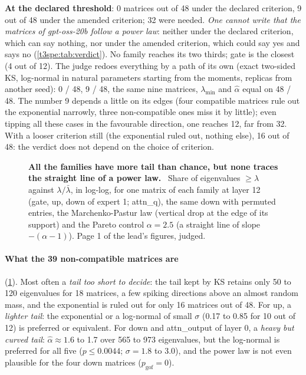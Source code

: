 \textbf{At the declared threshold}: 0 matrices out of 48 under the declared criterion, 9 out of 48 under the amended criterion; 32 were needed. \emph{One cannot write that the matrices of gpt-oss-20b follow a power law}: neither under the declared criterion, which can say nothing, nor under the amended criterion, which could say yes and says no (\cref{t3spe:tab:verdict}). No family reaches its two thirds; gate is the closest (4 out of 12). The judge redoes everything by a path of its own (exact two-sided KS, log-normal in natural parameters starting from the moments, replicas from another seed): 0 / 48, 9 / 48, the same nine matrices, $\lambda_{\min}$ and $\hat\alpha$ equal on 48 / 48. The number 9 depends a little on its edges (four compatible matrices rule out the exponential narrowly, three non-compatible ones miss it by little); even tipping all these cases in the favourable direction, one reaches 12, far from 32. With a looser criterion still (the exponential ruled out, nothing else), 16 out of 48: the verdict does not depend on the choice of criterion.

\begin{figure}[tbp]
\centering
{}
\caption[The tail of the spectra of layer 12]{\textbf{All the families have more tail than chance, but none traces the straight line of a power law.} \mes~Share of eigenvalues $\ge \lambda$ against $\lambda/\bar\lambda$, in log-log, for one matrix of each family at layer 12 (gate, up, down of expert 1; attn\_q), the same down with permuted entries, the Marchenko-Pastur law (vertical drop at the edge of its support) and the Pareto control $\alpha = 2.5$ (a straight line of slope $-(\alpha - 1)$). Page 1 of the lead's figures, judged. \HorsStyle{}}
\label{fig:t3-spec-survie}
\end{figure}

\paragraph{What the 39 non-compatible matrices are} (\cref{fig:t3-spec-survie}). Most often a \emph{tail too short to decide}: the tail kept by KS retains only 50 to 120 eigenvalues for 18 matrices, a few spiking directions above an almost random mass, and the exponential is ruled out for only 16 matrices out of 48. For up, a \emph{lighter tail}: the exponential or a log-normal of small $\sigma$ (0.17 to 0.85 for 10 out of 12) is preferred or equivalent. For down and attn\_output of layer 0, a \emph{heavy but curved tail}: $\hat\alpha \approx 1.6$ to 1.7 over 565 to 973 eigenvalues, but the log-normal is preferred for all five ($p \le 0.0044$; $\sigma = 1.8$ to 3.0), and the power law is not even plausible for the four down matrices ($p_{\mathrm{gof}} = 0$).


